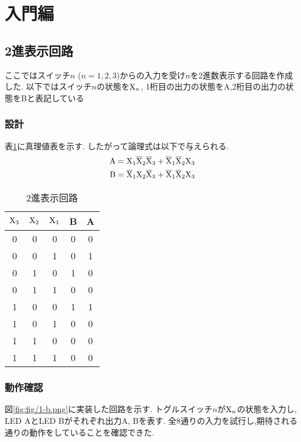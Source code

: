 \section{入門編}
\subsection{2進表示回路}
ここではスイッチ$n$ ($n=1,2,3$)からの入力を受け$n$を2進数表示する回路を作成した.
以下ではスイッチ$n$の状態を${\rm X}_n$,
1桁目の出力の状態をA,2桁目の出力の状態をBと表記している
\subsubsection{設計}
表\ref{tab:binary}に真理値表を示す.
したがって論理式は以下で与えられる.
\begin{align}
  \begin{split}
    {\rm A} &= {\rm X}_1{\rm\overline{X}}_2{\rm\overline{X}}_3+{\rm\overline{X}}_1{\rm\overline{X}}_2{\rm X}_3\\
    {\rm B} &= {\rm\overline{X}}_1{\rm X}_2{\rm\overline{X}}_3+{\rm\overline{X}}_1{\rm\overline{X}}_2{\rm X}_3
  \end{split}
\end{align}
\begin{table}[h]
  \label{tab:binary}
  \centering
  \begin{tabular}{ccc|cc}
    \hline
    ${\rm X}_3$ & ${\rm X}_2$ & ${\rm X}_1$ & B & A\\
    \hline
    0 & 0 & 0 & 0 & 0 \\
    0 & 0 & 1 & 0 & 1 \\
    0 & 1 & 0 & 1 & 0 \\
    0 & 1 & 1 & 0 & 0 \\
    1 & 0 & 0 & 1 & 1 \\
    1 & 0 & 1 & 0 & 0 \\
    1 & 1 & 0 & 0 & 0 \\
    1 & 1 & 1 & 0 & 0 \\
    \hline
  \end{tabular}
  \caption{2進表示回路}
\end{table}
\clearpage
\subsubsection{動作確認}
図\ref{fig:fig/1-b.png}に実装した回路を示す.
トグルスイッチ$n$が${\rm X}_n$の状態を入力し,
LED AとLED Bがそれぞれ出力A, Bを表す.
全8通りの入力を試行し,期待される通りの動作をしていることを確認できた.
\clearpage
